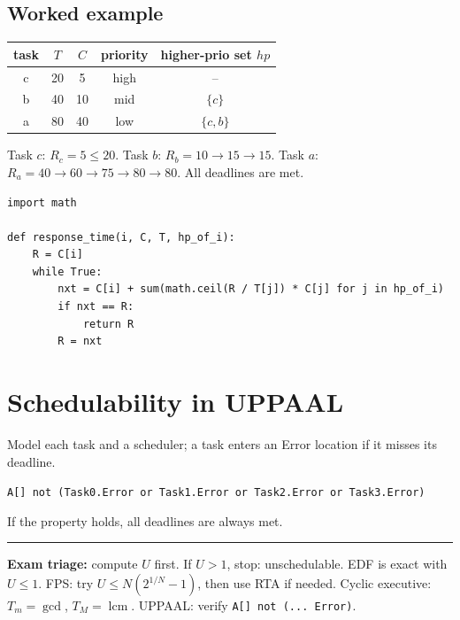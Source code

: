 \subsection*{Worked example}
\begin{center}\small
\begin{tabular}{@{}ccccc@{}}
\toprule
task & $T$ & $C$ & priority & higher-prio set $hp$\\
\midrule
c & 20 & 5 & high & --\\
b & 40 & 10 & mid & $\{c\}$\\
a & 80 & 40 & low & $\{c,b\}$\\
\bottomrule
\end{tabular}
\end{center}
Task $c$: $R_c=5\le 20$. Task $b$: $R_b=10\to 15\to 15$. Task $a$: $R_a=40\to 60\to 75\to 80\to 80$. All deadlines are met.

\begin{lstlisting}
import math

def response_time(i, C, T, hp_of_i):
    R = C[i]
    while True:
        nxt = C[i] + sum(math.ceil(R / T[j]) * C[j] for j in hp_of_i)
        if nxt == R:
            return R
        R = nxt
\end{lstlisting}

\section{Schedulability in UPPAAL}
Model each task and a scheduler; a task enters an Error location if it misses its deadline.
\begin{keybox}
\texttt{A[] not (Task0.Error or Task1.Error or Task2.Error or Task3.Error)}
\end{keybox}
If the property holds, all deadlines are always met.

\vspace{3pt}
\hrule
\vspace{2pt}
{\footnotesize\textbf{Exam triage:} compute $U$ first. If $U>1$, stop: unschedulable. EDF is exact with $U\le 1$. FPS: try $U\le N(2^{1/N}-1)$, then use RTA if needed. Cyclic executive: $T_m=\gcd$, $T_M=\operatorname{lcm}$. UPPAAL: verify \texttt{A[] not (... Error)}.}
